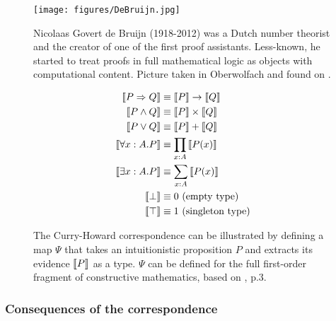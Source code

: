 \documentclass[12pt,a4paper,twoside,xetex]{book} %
\begin{document}
\begin{figure}
\begin{center}
\texttt{[image: figures/DeBruijn.jpg]}
\par\end{center}
\caption{\label{fig:Nicolaas-Govert-de}Nicolaas Govert de Bruijn (1918-2012)
 was a Dutch number theorist and the creator of one of the first proof assistants. Less-known, he started to treat proofs in full mathematical logic as objects with 
computational content. Picture taken in Oberwolfach and found on \cite{Konrad2017}.}
\end{figure}

\begin{figure}\label{currypsi}
\centering

\begin{align*}
\left\llbracket P\Rightarrow Q\right\rrbracket &\equiv  \left\llbracket P\right\rrbracket \rightarrow \left\llbracket Q\right\rrbracket\\
\left\llbracket P\wedge Q\right\rrbracket     &\equiv  \left\llbracket P\right\rrbracket \times \left\llbracket Q\right\rrbracket\\
\left\llbracket P\vee Q\right\rrbracket       & \equiv  \left\llbracket P\right\rrbracket + \left\llbracket Q\right\rrbracket\\
\left\llbracket\forall x:A.P\right\rrbracket & \equiv  \prod_{x:A}\left\llbracket P(x)\right\rrbracket\\
\left\llbracket\exists x:A.P\right\rrbracket & \equiv \sum_{x:A}\left\llbracket P(x)\right\rrbracket \\
\left\llbracket\bot\right\rrbracket          & \equiv 0 \ \text{(empty type)} \\
\left\llbracket\top\right\rrbracket 		 & \equiv  1 \ \text{(singleton type)}
\end{align*}
\caption{The Curry-Howard correspondence can be illustrated by defining a map 
$\Psi$ that takes an intuitionistic proposition $P$ and extracts its evidence 
$\left\llbracket P\right\rrbracket$ as a type. $\Psi$ can be  defined for the full first-order 
fragment of constructive mathematics, based on \cite{Altenkirch2017}, p.3. }
\end{figure}


\subsubsection{Consequences of the correspondence}
\end{document}
